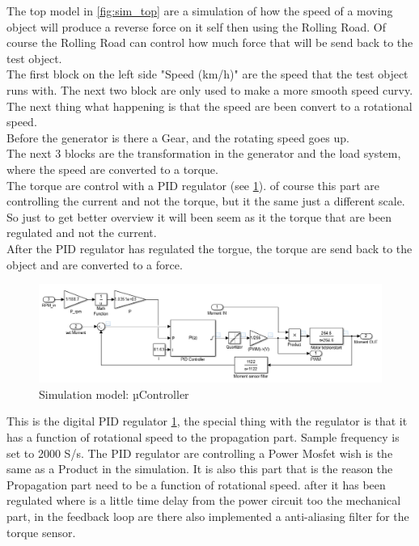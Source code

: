 The top model in \ref{fig:sim_top} are a simulation of how the speed of a moving object will produce a reverse force on it self then using the Rolling Road. Of course the Rolling Road can control how much force that will be send back to the test object.\\
The first block on the left side "Speed (km/h)" are the speed that the test object runs with. The next two block are only used to make a more smooth speed curvy.\\
The next thing what happening is that the speed are been convert to a rotational speed.\\
Before the generator is there a Gear, and the rotating speed goes up.\\
The next 3 blocks are the transformation in the generator and the load system, where the speed are converted to a torque.\\
The torque are control with a PID regulator (see \ref{fig:sim_PSOC}). of course this part are controlling the current and not the torque, but it the same just a different scale. So just to get better overview it will been seem as it the torque that are been regulated and not the current.\\ 
After the PID regulator has regulated the torgue, the torque are send back to the object and are converted to a force.   

\begin{figure}[H]
	\centering
	\includegraphics [width=6in]{Hardware/Pictures/simulation_uController.PNG}
	\caption{Simulation model: µController}
	\label{fig:sim_PSOC}
\end{figure}  

This is the digital PID regulator \ref{fig:sim_PSOC}, the special thing with the regulator is that it has a function of rotational speed to the propagation part. Sample frequency is set to 2000 S/s. The PID regulator are controlling a Power Mosfet wish is the same as a Product in the simulation. It is also this part that is the reason the Propagation part need to be a function of rotational speed. after it has been regulated where is a little time delay from the power circuit too the mechanical part, in the feedback loop are there also implemented a anti-aliasing filter for the torque sensor.  

